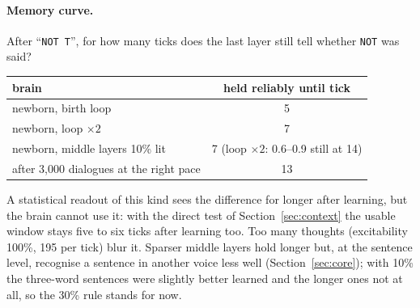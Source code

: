 \documentclass[11pt]{article}
\begin{document}
\paragraph{Memory curve.} After ``\texttt{NOT T}'', for how many ticks does the last layer still tell whether
\texttt{NOT} was said?
\begin{center}\small
\begin{tabular}{lc}
\toprule
brain & held reliably until tick\\
\midrule
newborn, birth loop & 5\\
newborn, loop $\times2$ & 7\\
newborn, middle layers 10\% lit & 7 (loop $\times2$: 0.6--0.9 still at 14)\\
after 3,000 dialogues at the right pace & 13\\
\bottomrule
\end{tabular}
\end{center}
A statistical readout of this kind sees the difference for longer after learning, but the brain cannot use it: with the
direct test of Section~\ref{sec:context} the usable window stays five to six ticks after learning too. Too many thoughts (excitability 100\%, 195 per tick) blur it. Sparser middle layers hold longer but, at
the sentence level, recognise a sentence in another voice less well (Section~\ref{sec:core}); with 10\% the three-word
sentences were slightly better learned and the longer ones not at all, so the 30\% rule stands for now.
\end{document}
